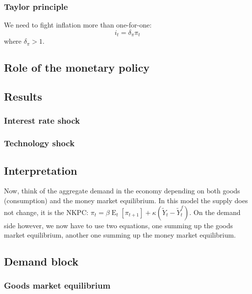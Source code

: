 \documentclass[12pt]{report}
\newcommand{\Et}[1]{\operatorname{E}_t\left[#1\right]}
\begin{document}
\subsubsection{Taylor principle}

We need to fight inflation more than one-for-one: $$i_t = \delta_\pi \pi_t $$ where $\delta_\pi > 1 $.

\subsection{Role of the monetary policy}



\subsection{Results}

\subsubsection{Interest rate shock}



\subsubsection{Technology shock}



\subsection{Interpretation}





Now, think of the aggregate demand in the economy depending on both goods (consumption) and the money market equilibrium. In this model the supply does not change, it is the NKPC: $\pi_t = \beta \Et{\pi_{t+1}} + \kappa(\tilde Y_t - \tilde Y_t^f)$. On the demand side however, we now have to use two equations, one summing up the goods market equilibrium, another one summing up the money market equilibrium.

\subsection{Demand block}

\subsubsection{Goods market equilibrium}
\end{document}
